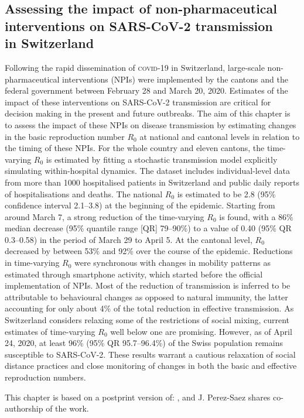 \begin{fullwidth}
\chapter[Assessing the impact of non-pharmaceutical interventions on SARS-CoV-2 transmission in Switzerland]{Assessing the impact of non-pharmaceutical\\ interventions on SARS-CoV-2 transmission\\ in Switzerland}
\label{ch:covid-switzerland-npi}

Following the rapid dissemination of \textsc{covid}-19 in Switzerland, large-scale non-pharmaceutical interventions (NPIs) were implemented by the cantons and the federal government between February 28 and March 20, 2020. Estimates of the impact of these interventions on SARS-CoV-2 transmission are critical for decision making in the present and future outbreaks. The aim of this chapter is to assess the impact of these NPIs on disease transmission by estimating changes in the basic reproduction number $R_0$ at national and cantonal levels in relation to the timing of these NPIs. For the whole country and eleven cantons, the time-varying $R_0$ is estimated by fitting a stochastic transmission model explicitly simulating within-hospital dynamics. The dataset includes individual-level data from more than 1000 hospitalised patients in Switzerland and public daily reports of hospitalisations and deaths. The national $R_0$ is estimated to be 2.8 (95\% confidence interval 2.1–3.8) at the beginning of the epidemic. Starting from around March 7, a strong reduction of the time-varying $R_0$ is found, with a 86\% median decrease (95\% quantile range [QR] 79–90\%) to a value of 0.40 (95\% QR 0.3–0.58) in the period of March 29 to April 5. At the cantonal level, $R_0$ decreased by between 53\% and 92\% over the course of the epidemic. Reductions in time-varying $R_0$ were synchronous with changes in mobility patterns as estimated through smartphone activity, which started before the official implementation of NPIs. Most of the reduction of transmission is inferred to be attributable to behavioural changes as opposed to natural immunity, the latter accounting for only about 4\% of the total reduction in effective transmission. As Switzerland considers relaxing some of the restrictions of social mixing, current estimates of time-varying $R_0$ well below one are promising. However, as of April 24, 2020, at least 96\% (95\% QR 95.7–96.4\%) of the Swiss population remains susceptible to SARS-CoV-2. These results warrant a cautious relaxation of social distance practices and close monitoring of changes in both the basic and effective reproduction numbers.

This chapter is based on a postprint version of:
, and J. Perez-Saez shares co-authorship of the work.
\end{fullwidth}

